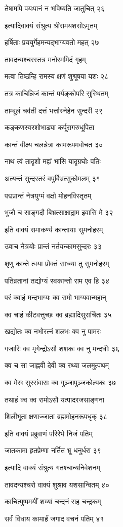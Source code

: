 तेषामपि पयःपानं न भविष्यति जातुचित् २६

इत्यादिवाक्यं संश्रुत्य श्रीरामयशसोऽमृतम्

हर्षिताः प्रययुर्गेहमन्यद्भाग्यवतो महत् २७

तावदन्यश्चरस्तत्र मनोरममिदं गृहम्

मत्वा तिष्ठन्हि रामस्य क्षणं शुश्रूषया यशः २८

तत्र काचिन्निजं कान्तं पर्यङ्कोपरि सुस्थितम्

ताम्बूलं चर्वती दत्तं भर्त्तास्नेहेन सुन्दरी २९

कङ्कणस्वरशोभाढ्या कर्पूरागरुधूपिता

कान्तं वीक्ष्य चलन्नेत्रा कामरूपमवोचत ३०

नाथ त्वं तादृशो मह्यं भासि यादृग्रघोः पतिः

अत्यन्तं सुन्दरतरं वपुर्बिभ्रत्सुकोमलम् ३१

पद्मप्रान्तं नेत्रयुग्मं वक्षो मोहनविस्तृतम्

भुजौ च साङ्गदौ बिभ्रत्साक्षाद्राम इवासि मे ३२

इति वाक्यं समाकर्ण्य कान्तायाः सुमनोहरम्

उवाच नेत्रयोः प्रान्तं नर्तयन्कामसुन्दरः ३३

शृणु कान्ते त्वया प्रोक्तं साध्व्या तु सुमनोहरम्

पतिव्रतानां तद्योग्यं स्वकान्तो राम एव हि ३४

परं क्वाहं मन्दभाग्यः क्व रामो भाग्यवान्महान्

क्व चाहं कीटवत्तुच्छः क्व ब्रह्मादिसुरार्चितः ३५

खद्योतः क्व नभोरत्नं शलभः क्व नु पामरः

गजारिः क्व मृगेन्द्रोऽसौ शशकः क्व नु मन्दधीः ३६

क्व च सा जाह्नवी देवी क्व रथ्या जलमुत्पथम्

क्व मेरुः सुरसंवासः क्व गुञ्जापुञ्जकोल्पकः ३७

तथाहं क्व क्व रामोऽसौ यत्पादरजसाङ्गना

शिलीभूता क्षणाज्जाता ब्रह्ममोहनरूपधृक् ३८

इति वाक्यं प्रब्रुवाणं परिरेभे निजं पतिम्

जातकामा हृतप्रेम्णा नर्तित भ्रू धनुर्धरा ३९

इत्यादि वाक्यं संश्रुत्य गतश्चान्यनिवेशनम्

तावदन्यश्चरो वाक्यं शुश्राव यशसान्वितम् ४०

काचित्पुष्पमयीं शय्यां चन्दनं सह चन्द्रकम्

सर्वं विधाय कामार्हं जगाद वचनं पतिम् ४१

